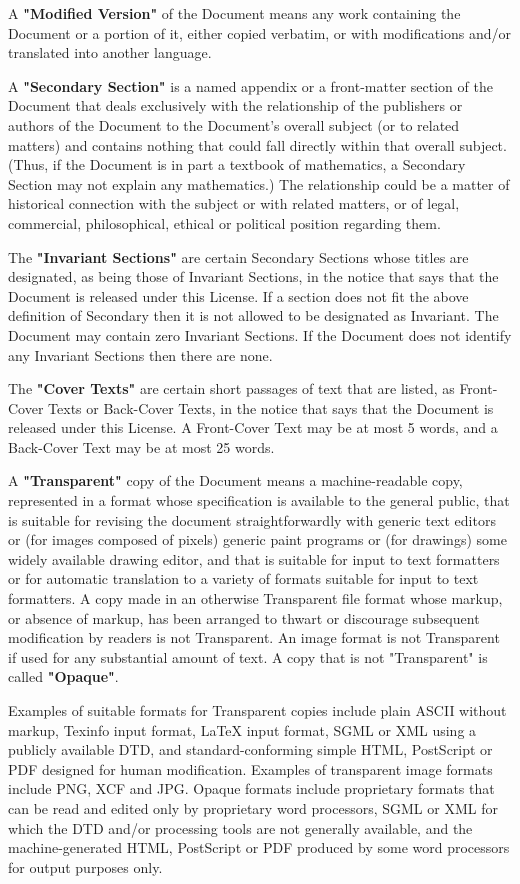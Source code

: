 \documentclass[12pt]{book}
\begin{document}
A \textbf{"Modified Version"} of the Document means any work containing the
Document or a portion of it, either copied verbatim, or with
modifications and/or translated into another language.

A \textbf{"Secondary Section"} is a named appendix or a front-matter section of
the Document that deals exclusively with the relationship of the
publishers or authors of the Document to the Document's overall subject
(or to related matters) and contains nothing that could fall directly
within that overall subject.  (Thus, if the Document is in part a
textbook of mathematics, a Secondary Section may not explain any
mathematics.)  The relationship could be a matter of historical
connection with the subject or with related matters, or of legal,
commercial, philosophical, ethical or political position regarding
them.

The \textbf{"Invariant Sections"} are certain Secondary Sections whose titles
are designated, as being those of Invariant Sections, in the notice
that says that the Document is released under this License.  If a
section does not fit the above definition of Secondary then it is not
allowed to be designated as Invariant.  The Document may contain zero
Invariant Sections.  If the Document does not identify any Invariant
Sections then there are none.

The \textbf{"Cover Texts"} are certain short passages of text that are listed,
as Front-Cover Texts or Back-Cover Texts, in the notice that says that
the Document is released under this License.  A Front-Cover Text may
be at most 5 words, and a Back-Cover Text may be at most 25 words.

A \textbf{"Transparent"} copy of the Document means a machine-readable copy,
represented in a format whose specification is available to the
general public, that is suitable for revising the document
straightforwardly with generic text editors or (for images composed of
pixels) generic paint programs or (for drawings) some widely available
drawing editor, and that is suitable for input to text formatters or
for automatic translation to a variety of formats suitable for input
to text formatters.  A copy made in an otherwise Transparent file
format whose markup, or absence of markup, has been arranged to thwart
or discourage subsequent modification by readers is not Transparent.
An image format is not Transparent if used for any substantial amount
of text.  A copy that is not "Transparent" is called \textbf{"Opaque"}.

Examples of suitable formats for Transparent copies include plain
ASCII without markup, Texinfo input format, LaTeX input format, SGML
or XML using a publicly available DTD, and standard-conforming simple
HTML, PostScript or PDF designed for human modification.  Examples of
transparent image formats include PNG, XCF and JPG.  Opaque formats
include proprietary formats that can be read and edited only by
proprietary word processors, SGML or XML for which the DTD and/or
processing tools are not generally available, and the
machine-generated HTML, PostScript or PDF produced by some word
processors for output purposes only.
\end{document}
